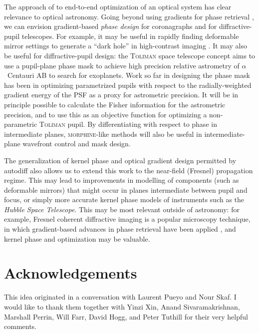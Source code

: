 \documentclass[modern]{aastex63}
\begin{document}
The approach of \citet{sitzmann2018} to end-to-end optimization of an optical system has clear relevance to optical astronomy. Going beyond using gradients for phase retrieval \citep{jurling14}, we can envision gradient-based \textit{phase design} for coronagraphs and for diffractive-pupil telescopes. For example, it may be useful in rapidly finding deformable mirror settings to generate a ``dark hole'' in high-contrast imaging \citep{malbet95}. It may also be useful for diffractive-pupil design: the \textsc{Toliman} space telescope concept \citep{tuthill18,bendek18} aims to use a pupil-plane phase mask to achieve high precision relative astrometry of $\alpha$~Centauri AB to search for exoplanets. Work so far in designing the phase mask has been in optimizing parametrized pupils with respect to the radially-weighted gradient energy of the PSF as a proxy for astrometric precision. It will be in principle possible to calculate the Fisher information for the astrometric precision, and to use this as an objective function for optimizing a non-parametric \textsc{Toliman} pupil. By differentiating with respect to phase in intermediate planes, \textsc{morphine}-like methods will also be useful in intermediate-plane wavefront control and mask design.

The generalization of kernel phase and optical gradient design permitted by autodiff also allows us to extend this work to the near-field (Fresnel) propagation regime. This may lead to improvements in modelling of components (such as deformable mirrors) that might occur in planes intermediate between pupil and focus, or simply more accurate kernel phase models of instruments such as the \textit{Hubble Space Telescope}. This may be most relevant outside of astronomy: for example, Fresnel coherent diffractive imaging \citep{williams2006} is a popular microscopy technique, in which gradient-based advances in phase retrieval have been applied \citep{Dueaay3700}, and kernel phase and optimization may be valuable.

\section*{Acknowledgements} %

This idea originated in a conversation with Laurent Pueyo and Nour Skaf. I would like to thank them together with Yinzi Xin, Anand Sivaramakrishnan, Marshall Perrin, Will Farr, David Hogg, and Peter Tuthill for their very helpful comments.
\end{document}
